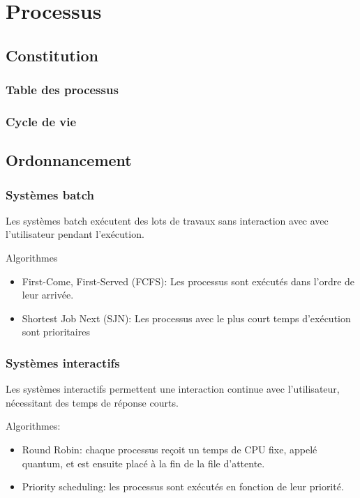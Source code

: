 \section{Processus}\label{sec:processus}

\subsection{Constitution}
\subsubsection{Table des processus}
\subsubsection{Cycle de vie}

\subsection{Ordonnancement}
\subsubsection{Systèmes batch}

Les systèmes batch exécutent des lots de travaux sans interaction avec avec l'utilisateur pendant l'exécution.

Algorithmes
\begin{itemize}
    \item First-Come, First-Served (FCFS): Les processus sont exécutés dans l'ordre de leur arrivée.
    \item Shortest Job Next (SJN): Les processus avec le plus court temps d'exécution sont prioritaires
\end{itemize}
\subsubsection{Systèmes interactifs}

Les systèmes interactifs permettent une interaction continue avec l'utilisateur, nécessitant des temps de réponse courts.

Algorithmes:
\begin{itemize}
    \item Round Robin: chaque processus reçoit un temps de CPU fixe, appelé quantum, et est ensuite placé à la fin de la file d'attente.
    \item Priority scheduling: les processus sont exécutés en fonction de leur priorité.
\end{itemize}
